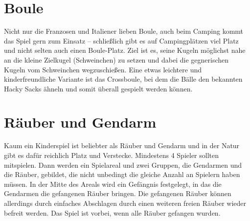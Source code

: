 \documentclass[a4paper]{report}
\begin{document}
\section*{Boule}
Nicht nur die Franzosen und Italiener lieben Boule, auch beim Camping kommt das Spiel gern zum Einsatz – schließlich gibt es auf Campingplätzen viel Platz und nicht selten auch einen Boule-Platz. Ziel ist es, seine Kugeln möglichst nahe an die kleine Zielkugel (Schweinchen) zu setzen und dabei die gegnerischen Kugeln vom Schweinchen wegzuschießen. Eine etwas leichtere und kinderfreundliche Variante ist das Crossboule, bei dem die Bälle den bekannten Hacky Sacks ähneln und somit überall gespielt werden können.

\section*{Räuber und Gendarm}
Kaum ein Kinderspiel ist beliebter als Räuber und Gendarm und in der Natur gibt es dafür reichlich Platz und Verstecke. Mindestens 4 Spieler sollten mitspielen. Dann werden ein Spielareal und zwei Gruppen, die Gendarmen und die Räuber, gebildet, die nicht unbedingt die gleiche Anzahl an Spielern haben müssen. In der Mitte des Areals wird ein Gefängnis festgelegt, in das die Gendarmen die gefangenen Räuber bringen. Die gefangenen Räuber können allerdings durch einfaches Abschlagen durch einen weiteren freien Räuber wieder befreit werden. Das Spiel ist vorbei, wenn alle Räuber gefangen wurden.
\end{document}
